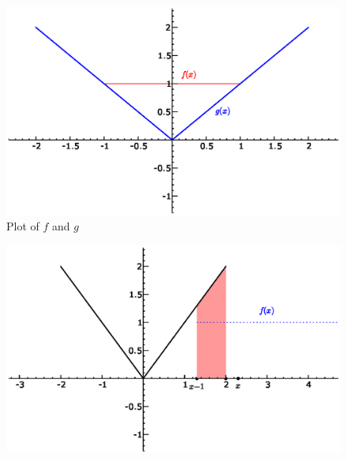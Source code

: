 \begin{ex}
\begin{figure}[ht!]
\includegraphics[width=\textwidth]{img/19May2008img1.eps}
\caption{Plot of $f$ and $g$}
\end{figure}
\begin{figure}[hb!]
\includegraphics[width=\textwidth]{img/19May2008img2.eps}

\end{figure}
\end{ex}
